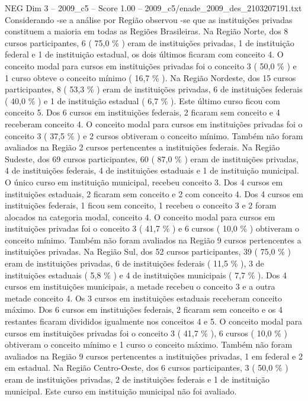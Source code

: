 \begin{textsample}{NEG Dim 3 – 2009\_c5 – Score 1.00 – 2009\_c5/enade\_2009\_des\_2103207191.txt}
Considerando -se a análise por Região observou -se que as instituições privadas constituem a maioria em todas as Regiões Brasileiras.
Na Região Norte, dos 8 cursos participantes, 6 ( 75,0 \% ) eram de instituições privadas, 1 de instituição federal e 1 de instituição estadual, os dois últimos ficaram com conceito 4.
O conceito modal para cursos em instituições privadas foi o conceito 3 ( 50,0 \% ) e 1 curso obteve o conceito mínimo ( 16,7 \% ).
Na Região Nordeste, dos 15 cursos participantes, 8 ( 53,3 \% ) eram de instituições privadas, 6 de instituições federais ( 40,0 \% ) e 1 de instituição estadual ( 6,7 \% ).
Este último curso ficou com conceito 5.
Dos 6 cursos em instituições federais, 2 ficaram sem conceito e 4 receberam conceito 4.
O conceito modal para cursos em instituições privadas foi o conceito 3 ( 37,5 \% ) e 2 cursos obtiveram o conceito mínimo.
Também não foram avaliados na Região 2 cursos pertencentes a instituições federais.
Na Região Sudeste, dos 69 cursos participantes, 60 ( 87,0 \% ) eram de instituições privadas, 4 de instituições federais, 4 de instituições estaduais e 1 de instituição municipal.
O único curso em instituição municipal, recebeu conceito 3.
Dos 4 cursos em instituições estaduais, 2 ficaram sem conceito e 2 com conceito 4.
Dos 4 cursos em instituições federais, 1 ficou sem conceito, 1 recebeu o conceito 3 e 2 foram alocados na categoria modal, conceito 4.
O conceito modal para cursos em instituições privadas foi o conceito 3 ( 41,7 \% ) e 6 cursos ( 10,0 \% ) obtiveram o conceito mínimo.
Também não foram avaliados na Região 9 cursos pertencentes a instituições privadas.
Na Região Sul, dos 52 cursos participantes, 39 ( 75,0 \% ) eram de instituições privadas, 6 de instituições federais ( 11,5 \% ), 3 de instituições estaduais ( 5,8 \% ) e 4 de instituições municipais ( 7,7 \% ).
Dos 4 cursos em instituições municipais, a metade recebeu o conceito 3 e a outra metade conceito 4.
Os 3 cursos em instituições estaduais receberam conceito máximo.
Dos 6 cursos em instituições federais, 2 ficaram sem conceito e os 4 restantes ficaram divididos igualmente nos conceitos 4 e 5.
O conceito modal para cursos em instituições privadas foi o conceito 3 ( 41,7 \% ), 6 cursos ( 10,0 \% ) obtiveram o conceito mínimo e 1 curso o conceito máximo.
Também não foram avaliados na Região 9 cursos pertencentes a instituições privadas, 1 em federal e 2 em estadual.
Na Região Centro-Oeste, dos 6 cursos participantes, 3 ( 50,0 \% ) eram de instituições privadas, 2 de instituições federais e 1 de instituição municipal.
Este curso em instituição municipal não foi avaliado.

\end{textsample}
